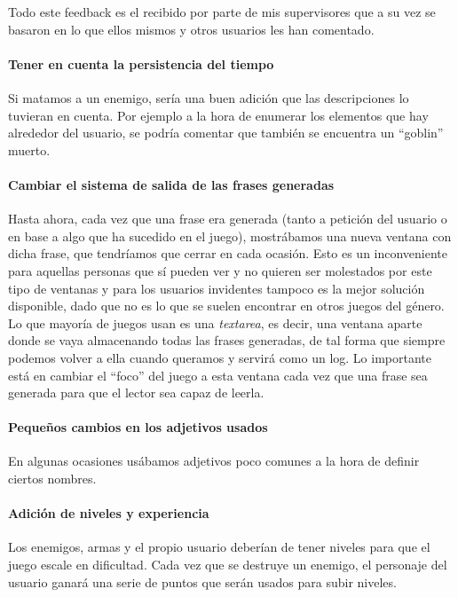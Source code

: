 Todo este feedback es el recibido por parte de mis supervisores que a su vez se basaron en lo que ellos mismos y otros usuarios les han comentado.

\paragraph{Tener en cuenta la persistencia del tiempo} Si matamos a un enemigo, sería una buen adición que las descripciones lo tuvieran en cuenta. Por ejemplo a la hora de enumerar los elementos que hay alrededor del usuario, se podría comentar que también se encuentra un ``goblin'' muerto.

\paragraph{Cambiar el sistema de salida de las frases generadas} Hasta ahora, cada vez que una frase era generada (tanto a petición del usuario o en base a algo que ha sucedido en el juego), mostrábamos una nueva ventana con dicha frase, que tendríamos que cerrar en cada ocasión. Esto es un inconveniente para aquellas personas que sí pueden ver y no quieren ser molestados por este tipo de ventanas y para los usuarios invidentes tampoco es la mejor solución disponible, dado que no es lo que se suelen encontrar en otros juegos del género. Lo que mayoría de juegos usan es una \textit{textarea}, es decir, una ventana aparte donde se vaya almacenando todas las frases generadas, de tal forma que siempre podemos volver a ella cuando queramos y servirá como un log. Lo importante está en cambiar el ``foco'' del juego a esta ventana cada vez que una frase sea generada para que el lector sea capaz de leerla.

\paragraph{Pequeños cambios en los adjetivos usados} En algunas ocasiones usábamos adjetivos poco comunes a la hora de definir ciertos nombres.

\paragraph{Adición de niveles y experiencia} Los enemigos, armas y el propio usuario deberían de tener niveles para que el juego escale en dificultad. Cada vez que se destruye un enemigo, el personaje del usuario ganará una serie de puntos que serán usados para subir niveles.

